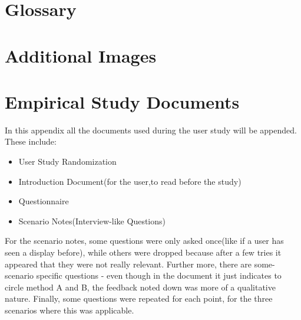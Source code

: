 \documentclass[]{article}
\begin{document}
\newpage



\newpage

\begin{appendices}

\section{Glossary}
\clearpage{\pagestyle{empty}\cleardoublepage}


\section{ Additional Images}
\label{appendix:B}
\clearpage{\pagestyle{empty}\cleardoublepage}

\section{Empirical Study Documents}

In this appendix all the documents used during the user study will be appended. These include:
\begin{itemize}
   \item User Study Randomization
   \item Introduction Document(for the user,to read before the study)
   \item Questionnaire
   \item Scenario Notes(Interview-like Questions)
\end{itemize}

For the scenario notes, some questions were only asked once(like if a user has seen a display before), while others were dropped because after a few tries it appeared that they were not really relevant. Further more, there are some-scenario specific questions - even though in the document it just indicates to circle method A and B, the feedback noted down was more of a qualitative nature. Finally, some questions were repeated for each point, for the three scenarios where this was applicable.





\clearpage{\pagestyle{empty}\cleardoublepage}
\end{appendices}
\end{document}
